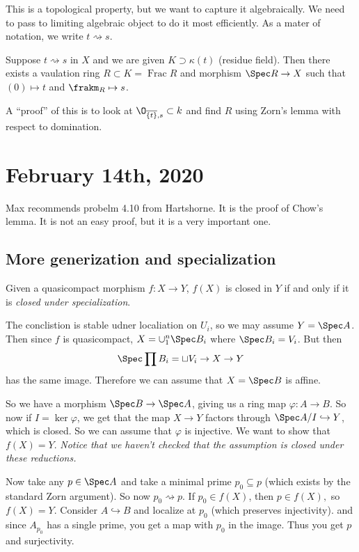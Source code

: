 \documentclass[12pt]{article}
\begin{document}
This is a topological property, but we want to capture it algebraically. We need to pass to limiting algebraic object 
to do it most efficiently. As a mater of notation, we write $t\rightsquigarrow s$.
\begin{lem}
	Suppose $t\rightsquigarrow s$ in $X$ and we are given $K\supset \kappa(t)$ (residue field). Then there exists a vaulation ring $R\subset K=\operatorname{Frac} R$ and 
	morphism $\Spec R\to X$ such that $(0)\mapsto t$ and $\frakm_R\mapsto s$.
\end{lem}
A ``proof'' of this is to look at $\O_{\overline{\{t\}},s}\subset k$ and find $R$ using Zorn's lemma with respect to domination.

\section{February 14th, 2020}
Max recommends probelm 4.10 from Hartshorne. It is the proof of Chow's lemma. It is not an easy proof, 
but it is a very important one.

\subsection{More generization and specialization}

\begin{lem}
	Given a quasicompact morphism $f:X\to Y$, $f(X)$ is closed in $Y$ if and only if it is \textit{closed under specialization}.
\end{lem}
\begin{prf}
	The conclistion is stable udner localiation on $U_i$, so we may assume $Y=\Spec A$. Then since $f$ is quasicompact, 
	$X=\cup_1^n\Spec B_i$ where $\Spec B_i=V_i$. But then 
	\[\Spec\prod B_i=\sqcup V_i\to X\to Y\]
	has the same image. Therefore we can assume that $X=\Spec B$ is affine.

	So we have a morphism $\Spec B\to \Spec A$, giving us a ring map $\varphi:A\to B$. So now if $I=\ker\varphi$,
	we get that the map $X\to Y$ factors through $\Spec A/I\hookrightarrow Y$, which is closed. So we can assume that $\varphi$ is injective.
	We want to show that $f(X)=Y$. \textit{Notice that we haven't checked that the assumption is closed under these reductions.}

	Now take any $p\in \Spec A$ and take a minimal prime $p_0\subseteq p$ (which exists by the standard Zorn argument).
	So now $p_0\rightsquigarrow p$. If $p_0\in f(X)$, then $p\in f(X),$ so $f(X)=Y$. Consider $A\hookrightarrow B$ and localize at $p_0$ (which preserves injectivity).
	and since $A_{p_0}$ has a single prime, you get a map with $p_0$ in the image. Thus you get $p$ and surjectivity.
\end{prf}
\end{document}
